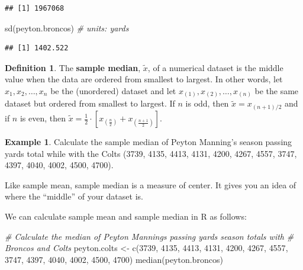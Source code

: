 \documentclass[
  11pt,
]{book}
\newenvironment{Shaded}{\begin{snugshade}}{\end{snugshade}}
\newcommand{\CommentTok}[1]{\textcolor[rgb]{0.56,0.35,0.01}{\textit{#1}}}
\newcommand{\DecValTok}[1]{\textcolor[rgb]{0.00,0.00,0.81}{#1}}
\newcommand{\FunctionTok}[1]{\textcolor[rgb]{0.00,0.00,0.00}{#1}}
\newcommand{\NormalTok}[1]{#1}
\newcommand{\OtherTok}[1]{\textcolor[rgb]{0.56,0.35,0.01}{#1}}
\theoremstyle{definition}
\newtheorem{definition}{Definition}[chapter]
\theoremstyle{definition}
\newtheorem{example}{Example}[chapter]
\theoremstyle{definition}
\theoremstyle{definition}
\theoremstyle{remark}
\begin{document}
\begin{verbatim}
## [1] 1967068
\end{verbatim}

\begin{Shaded}
\begin{Highlighting}[]
\FunctionTok{sd}\NormalTok{(peyton.broncos)  }\CommentTok{\# units: yards}
\end{Highlighting}
\end{Shaded}

\begin{verbatim}
## [1] 1402.522
\end{verbatim}

\begin{definition}
The \textbf{sample median}, \(\tilde{x}\), of a numerical dataset is the middle value when the data are ordered from smallest to largest. In other words, let \(x_1, x_2, \ldots, x_n\) be the (unordered) dataset and let \(x_{(1)},x_{(2)}, \ldots, x_{(n)}\) be the same dataset but ordered from smallest to largest. If \(n\) is odd, then \(\tilde{x} = x_{(n+1)/2}\) and if \(n\) is even, then \(\tilde{x} = \frac{1}{2} \cdot \left[x_{\left(\frac{n}{2}\right)} + x_{\left(\frac{n+1}{2}\right)}\right]\).
\end{definition}

\begin{example}
Calculate the sample median of Peyton Manning's season passing yards total while with the Colts (3739, 4135, 4413, 4131, 4200, 4267, 4557, 3747, 4397, 4040, 4002, 4500, 4700).
\end{example}

\hfill\break
\hfill\break
\hfill\break
\hfill\break
\hfill\break

Like sample mean, sample median is a measure of center. It gives you an idea of where the ``middle'' of your dataset is.

We can calculate sample mean and sample median in R as follows:

\begin{Shaded}
\begin{Highlighting}[]
\CommentTok{\# Calculate the median of Peyton Manning\textquotesingle{}s passing yards season totals with}
\CommentTok{\# Broncos and Colts}
\NormalTok{peyton.colts }\OtherTok{\textless{}{-}} \FunctionTok{c}\NormalTok{(}\DecValTok{3739}\NormalTok{, }\DecValTok{4135}\NormalTok{, }\DecValTok{4413}\NormalTok{, }\DecValTok{4131}\NormalTok{, }\DecValTok{4200}\NormalTok{, }\DecValTok{4267}\NormalTok{, }\DecValTok{4557}\NormalTok{, }\DecValTok{3747}\NormalTok{, }\DecValTok{4397}\NormalTok{, }\DecValTok{4040}\NormalTok{, }\DecValTok{4002}\NormalTok{,}
    \DecValTok{4500}\NormalTok{, }\DecValTok{4700}\NormalTok{)}
\FunctionTok{median}\NormalTok{(peyton.broncos)}
\end{Highlighting}
\end{Shaded}
\end{document}
